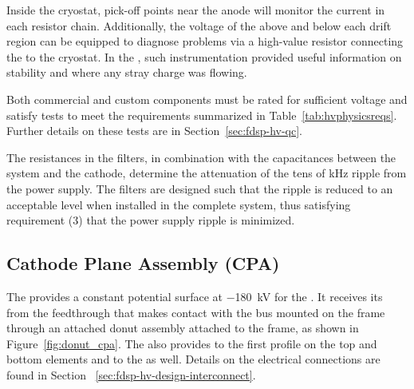 Inside the cryostat, pick-off points near the anode will monitor the current %
in each resistor chain.  Additionally, the voltage of the  above and below each drift region can be equipped to diagnose problems via a high-value resistor connecting the  to the cryostat.  In the , such instrumentation provided useful information on  stability and where any stray charge was flowing.

Both commercial and custom  components must be rated for sufficient voltage and satisfy tests to meet the requirements summarized in Table~\ref{tab:hvphysicsreqs}.  Further details on these tests are in Section~\ref{sec:fdsp-hv-qc}.

The resistances in the filters, in combination with the capacitances between the  system and the cathode,
 determine the attenuation of the tens of \si{\kilo\hertz} ripple from the power supply.  The filters %
are designed such that the ripple is reduced to an acceptable level when installed in the complete system, thus satisfying requirement (3) that the power supply ripple is minimized.

\subsection{Cathode Plane Assembly (CPA)}

The  provides a constant potential surface at \SI{-180}{\kV} for the .  It receives its  from the feedthrough that makes contact with the  bus mounted on the  frame through an attached donut assembly attached to the frame, as shown in Figure~\ref{fig:donut_cpa}. %
The  also provides  to the first profile on the top and bottom  elements and to the  as well. %
Details on the electrical connections are found in Section ~\ref{sec:fdsp-hv-design-interconnect}.

